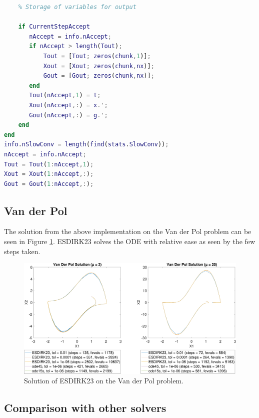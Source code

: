 \begin{adjustwidth*}{0cm}{-0.4cm}
\begin{lstlisting}[frame=single, language=Matlab,caption=ESDIRK23, label=ESDIRK23]
    %=====================================================================
    % Storage of variables for output
    
    if CurrentStepAccept
       nAccept = info.nAccept;
       if nAccept > length(Tout);
           Tout = [Tout; zeros(chunk,1)];
           Xout = [Xout; zeros(chunk,nx)];
           Gout = [Gout; zeros(chunk,nx)];
       end
       Tout(nAccept,1) = t;
       Xout(nAccept,:) = x.';
       Gout(nAccept,:) = g.';
    end
end
info.nSlowConv = length(find(stats.SlowConv));
nAccept = info.nAccept;
Tout = Tout(1:nAccept,1);
Xout = Xout(1:nAccept,:);
Gout = Gout(1:nAccept,:);
\end{lstlisting}
\end{adjustwidth*}

\subsection{Van der Pol}
The solution from the above implementation on the Van der Pol problem can be seen in Figure \ref{fig:7_4}. ESDIRK23 solves the ODE with relative ease as seen by the few steps taken.

\begin{figure}[h]
    \centering
    \includegraphics[width=\textwidth]{plots/7_4b.pdf}
    \caption{Solution of ESDIRK23 on the Van der Pol problem.}
    \label{fig:7_4}
\end{figure}

\subsection{Comparison with other solvers}



